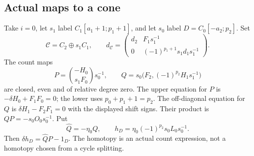 \documentclass[11pt]{amsart}
\theoremstyle{definition}
\theoremstyle{remark}
\theoremstyle{plain}
\begin{document}
\subsection{Actual maps to a cone}\label{sec:triangle-cone}
Take $i=0$, let $s_1$ label $C_1[a_1+1;p_1+1]$, and let
$s_0$ label $D=C_0[-a_2;p_2]$. Set
\begin{equation}\label{eq:surgery-cone}
 \mathcal C=C_2\oplus s_1C_1,\qquad
 d_{\mathcal C}=\begin{pmatrix}
 d_2&F_1s_1^{-1}\\0&(-1)^{p_1+1}s_1d_1s_1^{-1}
 \end{pmatrix}.
\end{equation}
The count maps
\begin{equation}\label{eq:surgery-PQ}
 P=\binom{-H_0}{s_1F_0}s_0^{-1},\qquad
 Q=s_0\bigl(F_2,(-1)^{p_2}H_1s_1^{-1}\bigr)
\end{equation}
are closed, even and of relative degree zero. The upper equation
for $P$ is $-\delta H_0+F_1F_0=0$; the lower uses
$p_0+p_1+1=p_2$. The off-diagonal equation for $Q$ is
$\delta H_1-F_2F_1=0$ with the displayed shift signs.
Their product is $QP=-s_0O_0s_0^{-1}$. Put
\begin{equation}\label{eq:surgery-retract}
 \widehat Q=-\eta_0Q,\qquad
 h_D=\eta_0(-1)^{p_2}s_0L_0s_0^{-1}.
\end{equation}
Then $\delta h_D=\widehat QP-1_D$. The homotopy is an actual
count expression, not a homotopy chosen from a cycle splitting.
\end{document}
